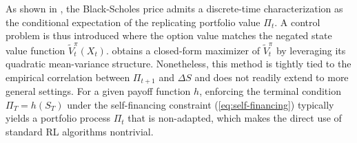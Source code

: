 As shown in \cite{halperin2020qlbs}, the Black-Scholes price admits a discrete-time characterization as the conditional expectation of the replicating portfolio value $\Pi_t$.
A control problem is thus introduced where the option value matches the negated state value function $\tilde{V}_{t}^{\pi}\left(X_{t}\right)$.
\cite{halperin2020qlbs} obtains a closed-form maximizer of
$\tilde{V}_{t}^{\pi}$
by leveraging its quadratic mean-variance structure.
Nonetheless, this method is tightly tied to the empirical correlation between $\Pi_{t+1}$ and $\Delta S$ and does not readily extend to more general settings.
For a given payoff function $h$, enforcing the terminal condition $\Pi_T = h(S_T)$ under the self-financing constraint (\cref{eq:self-financing}) typically yields a portfolio process $\Pi_t$ that is non-adapted, which makes the direct use of standard RL algorithms nontrivial.
